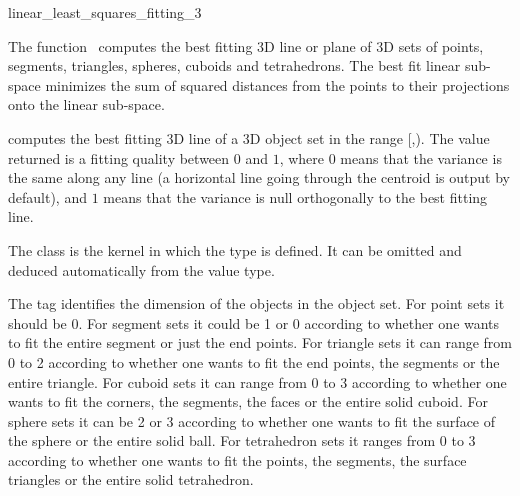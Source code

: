 
\begin{ccRefFunction}{linear_least_squares_fitting_3}  

\ccDefinition
  
The function \ccRefName\ computes the best fitting 3D line or plane of 3D sets of points, segments, triangles, spheres, cuboids and tetrahedrons. The best fit linear sub-space minimizes the sum of squared distances from the points to their projections onto the linear sub-space.


{ computes the best fitting 3D line of a 3D object set in the range
[,). The value returned is a fitting quality
between $0$ and $1$, where $0$ means that the variance is the same
along any line (a horizontal line going through the centroid is output
by default), and $1$ means that the variance is null orthogonally
to the best fitting line. }

The class  is the kernel in which the type
 is defined. It can be omitted and
deduced automatically from the value type.

The tag  identifies the dimension of the objects in the object set. For point sets it should be 0. For segment sets it could be 1 or 0 according to whether one wants to fit the entire segment or just the end points. For triangle sets it can range from 0 to 2 according to whether one wants to fit the end points, the segments or the entire triangle. For cuboid sets it can range from 0 to 3 according to whether one wants to fit the corners, the segments, the faces or the entire solid cuboid. For sphere sets it can be 2 or 3 according to whether one wants to fit the surface of the sphere or the entire solid ball. For tetrahedron sets it ranges from 0 to 3 according to whether one wants to fit the  points, the segments, the surface triangles or the entire solid tetrahedron.


\end{ccRefFunction}
